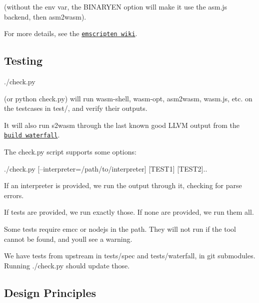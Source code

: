 (without the env var, the {\ttfamily B\+I\+N\+A\+R\+Y\+EN} option will make it use the asm.\+js backend, then {\ttfamily asm2wasm}).

For more details, see the \href{https://github.com/kripken/emscripten/wiki/WebAssembly}{\tt emscripten wiki}.

\subsection*{Testing}


\begin{DoxyCode}
./check.py
\end{DoxyCode}


(or {\ttfamily python check.\+py}) will run {\ttfamily wasm-\/shell}, {\ttfamily wasm-\/opt}, {\ttfamily asm2wasm}, {\ttfamily wasm.\+js}, etc. on the testcases in {\ttfamily test/}, and verify their outputs.

It will also run {\ttfamily s2wasm} through the last known good L\+L\+VM output from the \href{https://build.chromium.org/p/client.wasm.llvm/console}{\tt build waterfall}.

The {\ttfamily check.\+py} script supports some options\+:


\begin{DoxyCode}
./check.py [--interpreter=/path/to/interpreter] [TEST1] [TEST2]..
\end{DoxyCode}



\begin{DoxyItemize}
\item If an interpreter is provided, we run the output through it, checking for parse errors.
\item If tests are provided, we run exactly those. If none are provided, we run them all.
\item Some tests require {\ttfamily emcc} or {\ttfamily nodejs} in the path. They will not run if the tool cannot be found, and you\textquotesingle{}ll see a warning.
\item We have tests from upstream in {\ttfamily tests/spec} and {\ttfamily tests/waterfall}, in git submodules. Running {\ttfamily ./check.py} should update those.
\end{DoxyItemize}

\subsection*{Design Principles}


